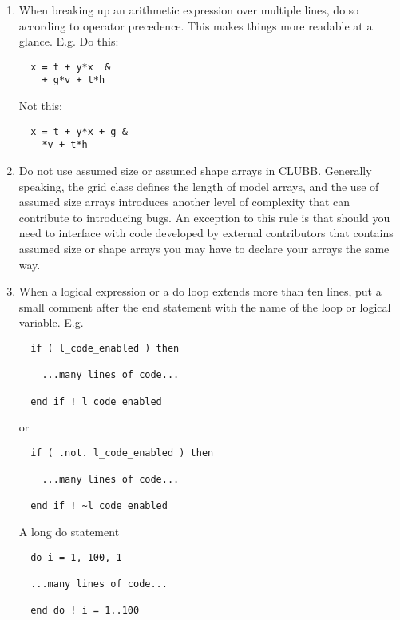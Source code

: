 \documentclass[letterpaper,12pt]{article}
\begin{document}
\begin{enumerate}
\begin{verbatim}
\end{verbatim}

\item When breaking up an arithmetic expression over multiple lines, do so according to 
operator precedence.  This makes things more readable at a glance. \newline
E.g. Do this: 
\begin{verbatim}
  x = t + y*x  &
    + g*v + t*h
\end{verbatim}

Not this:
\begin{verbatim}
  x = t + y*x + g &
    *v + t*h
\end{verbatim}

\item Do not use assumed size or assumed shape arrays in CLUBB.  
Generally speaking, the grid class defines the length of model arrays, 
and the use of assumed size arrays introduces another level of complexity 
that can contribute to introducing bugs.  An exception to this rule is
that should you need to interface with code developed by external contributors 
that contains assumed size or shape arrays you may have to declare your arrays
the same way.
\newline

\item When a logical expression or a do loop extends more than ten lines, put a
small comment after the end statement with the name of the loop or logical
variable.
E.g. \newline
\begin{verbatim}
  if ( l_code_enabled ) then

    ...many lines of code...

  end if ! l_code_enabled
\end{verbatim}

or 

\begin{verbatim}
  if ( .not. l_code_enabled ) then

    ...many lines of code...

  end if ! ~l_code_enabled
\end{verbatim}

A long do statement

\begin{verbatim}
  do i = 1, 100, 1

  ...many lines of code...

  end do ! i = 1..100
\end{verbatim}


\end{enumerate}
\end{document}
